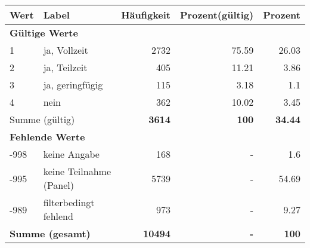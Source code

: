      \begin{longtable}{lXrrr}
     \toprule
     \textbf{Wert} & \textbf{Label} & \textbf{Häufigkeit} & \textbf{Prozent(gültig)} & \textbf{Prozent} \\
     \endhead
     \midrule
     \multicolumn{5}{l}{\textbf{Gültige Werte}}\\

     1 &
     \multicolumn{1}{X}{ ja, Vollzeit   } &


       \num{2732} &
       \num[round-mode=places,round-precision=2]{75,59} &
         \num[round-mode=places,round-precision=2]{26,03} \\

     2 &
     \multicolumn{1}{X}{ ja, Teilzeit   } &


       \num{405} &
       \num[round-mode=places,round-precision=2]{11,21} &
         \num[round-mode=places,round-precision=2]{3,86} \\

     3 &
     \multicolumn{1}{X}{ ja, geringfügig   } &


       \num{115} &
       \num[round-mode=places,round-precision=2]{3,18} &
         \num[round-mode=places,round-precision=2]{1,1} \\

     4 &
     \multicolumn{1}{X}{ nein   } &


       \num{362} &
       \num[round-mode=places,round-precision=2]{10,02} &
         \num[round-mode=places,round-precision=2]{3,45} \\
     \midrule
     \multicolumn{2}{l}{Summe (gültig)} &
       \textbf{\num{3614}} &
     \textbf{100} &
       \textbf{\num[round-mode=places,round-precision=2]{34,44}} \\
     \multicolumn{5}{l}{\textbf{Fehlende Werte}}\\
       -998 &
       keine Angabe &
         \num{168} &
        - &
         \num[round-mode=places,round-precision=2]{1,6} \\
       -995 &
       keine Teilnahme (Panel) &
         \num{5739} &
        - &
         \num[round-mode=places,round-precision=2]{54,69} \\
       -989 &
       filterbedingt fehlend &
         \num{973} &
        - &
         \num[round-mode=places,round-precision=2]{9,27} \\
     \midrule
     \multicolumn{2}{l}{\textbf{Summe (gesamt)}} &
          \textbf{\num{10494}} &
        \textbf{-} &
        \textbf{100} \\
     \bottomrule
     \end{longtable}
     

